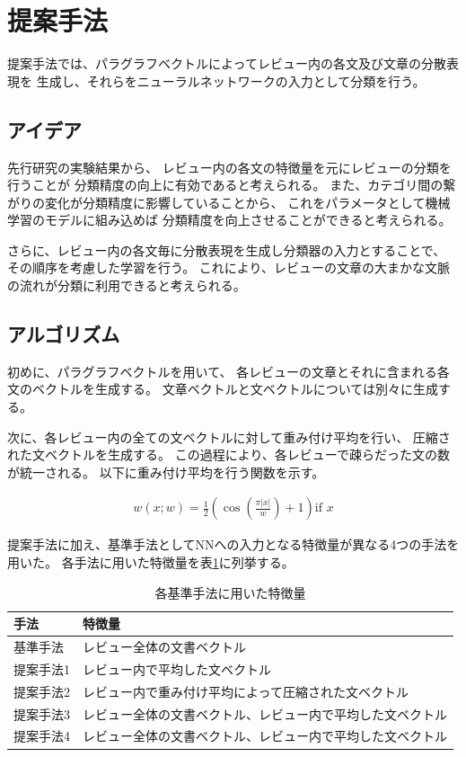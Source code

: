 \documentclass{ttithesis}
\begin{document}
\section{提案手法}

提案手法では、パラグラフベクトルによってレビュー内の各文及び文章の分散表現を
生成し、それらをニューラルネットワークの入力として分類を行う。

\subsection{アイデア}

先行研究\cite{fujitani15}の実験結果から、
レビュー内の各文の特徴量を元にレビューの分類を行うことが
分類精度の向上に有効であると考えられる。
また、カテゴリ間の繋がりの変化が分類精度に影響していることから、
これをパラメータとして機械学習のモデルに組み込めば
分類精度を向上させることができると考えられる。

さらに、レビュー内の各文毎に分散表現を生成し分類器の入力とすることで、
その順序を考慮した学習を行う。
これにより、レビューの文章の大まかな文脈の流れが分類に利用できると考えられる。

\subsection{アルゴリズム}

初めに、パラグラフベクトルを用いて、
各レビューの文章とそれに含まれる各文のベクトルを生成する。
文章ベクトルと文ベクトルについては別々に生成する。

次に、各レビュー内の全ての文ベクトルに対して重み付け平均を行い、
圧縮された文ベクトルを生成する。
この過程により、各レビューで疎らだった文の数が統一される。
以下に重み付け平均を行う関数を示す。

\begin{gather}
w(x; w) = \frac{1}{2} (\cos(\frac{\pi |x|}{w}) + 1) \text{if $x$}
\end{gather}


提案手法に加え、基準手法としてNNへの入力となる特徴量が異なる4つの手法を用いた。
各手法に用いた特徴量を表\ref{tab:MethodFeatures}に列挙する。

\begin{table}
  \caption{各基準手法に用いた特徴量}
  \begin{tabular}{l | l}\label{tab:MethodFeatures}
    手法 & 特徴量 \\
    \hline
    基準手法  & レビュー全体の文書ベクトル \\
    提案手法1 & レビュー内で平均した文ベクトル \\
    提案手法2 & レビュー内で重み付け平均によって圧縮された文ベクトル \\
    提案手法3 & レビュー全体の文書ベクトル、レビュー内で平均した文ベクトル \\
    提案手法4 & レビュー全体の文書ベクトル、レビュー内で平均した文ベクトル \\
  \end{tabular}
\end{table}
\end{document}
